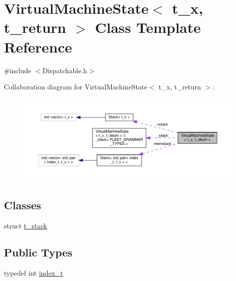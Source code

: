 \hypertarget{class_virtual_machine_state}{}\section{Virtual\+Machine\+State$<$ t\+\_\+x, t\+\_\+return $>$ Class Template Reference}
\label{class_virtual_machine_state}


{\ttfamily \#include $<$Dispatchable.\+h$>$}



Collaboration diagram for Virtual\+Machine\+State$<$ t\+\_\+x, t\+\_\+return $>$\+:\nopagebreak
\begin{figure}[H]
\begin{center}
\leavevmode
\includegraphics[width=350pt]{class_virtual_machine_state__coll__graph}
\end{center}
\end{figure}
\subsection*{Classes}
\begin{DoxyCompactItemize}
\item 
struct \hyperlink{struct_virtual_machine_state_1_1t__stack}{t\+\_\+stack}
\end{DoxyCompactItemize}
\subsection*{Public Types}
\begin{DoxyCompactItemize}
\item 
typedef int \hyperlink{class_virtual_machine_state_ad082a1996e3cce1eb04bc788c24a3214}{index\+\_\+t}
\end{DoxyCompactItemize}
